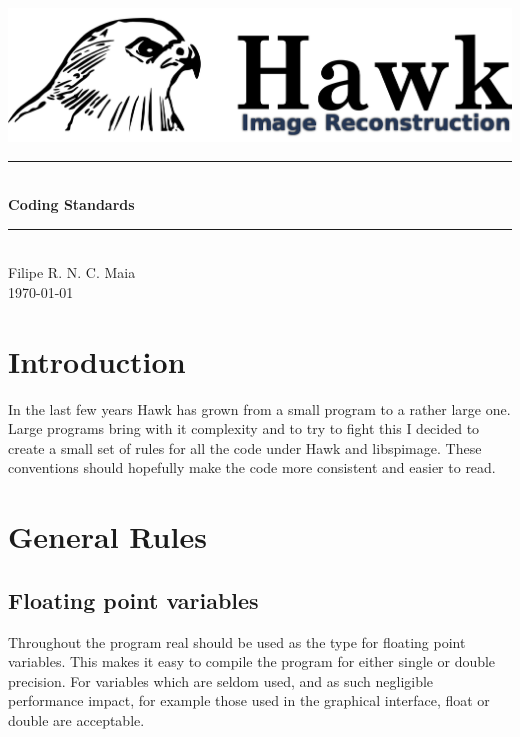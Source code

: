 \documentclass[12pt]{article}
\newcommand{\HRule}{\rule{\linewidth}{0.5mm}}
\begin{document}
\begin{center}
\includegraphics[width=1\textwidth]{./Hawk2.png}\\[0.5cm]
\HRule \\[0.4cm]
{\huge \bfseries Coding Standards}\\[0.1cm]
\HRule \\[1.0cm]
{\large Filipe R. N. C. Maia}\\[0.4cm]
{\large \today}\\[1.0cm]
\end{center}




\section{Introduction}
In the last few years Hawk has grown from a small program to a rather large one. Large programs bring
with it complexity and to try to fight this I decided to create a small set of rules for all the code
under Hawk and libspimage. These conventions should hopefully make the code more consistent and easier to read.

\section{General Rules}
\subsection{Floating point variables}
Throughout the program real should be used as the type for floating point variables.
This makes it easy to compile the program for either single or double precision. For variables which are seldom used, and as such negligible performance impact, for example those used in the graphical interface, float or double are acceptable.
\end{document}
